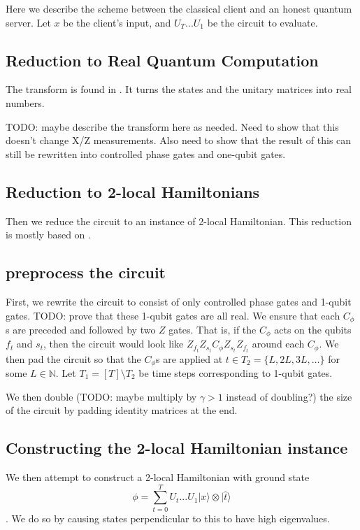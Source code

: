 \documentclass{article}
\theoremstyle{definition}
\begin{document}
Here we describe the scheme between the classical client and an honest quantum server.
Let $x$ be the client's input, and $U_T...U_1$ be the circuit to evaluate.

\subsection{Reduction to Real Quantum Computation}

The transform is found in \cite{1109.0795}. It turns the states and the unitary matrices into real numbers.

TODO: maybe describe the transform here as needed. Need to show that this doesn't change X/Z measurements. Also need to show that the result of this can still be rewritten into controlled phase gates and one-qubit gates.

\subsection{Reduction to 2-local Hamiltonians}

Then we reduce the circuit to an instance of 2-local Hamiltonian. This reduction is mostly based on \cite{quant-ph/0406180}.

\subsection{preprocess the circuit}

First, we rewrite the circuit to consist of only controlled phase gates and 1-qubit gates. TODO: prove that these 1-qubit gates are all real. We ensure that each $C_\phi$s are preceded and followed by two $Z$ gates. That is, if the $C_\phi$ acts on the qubits $f_t$ and $s_t$, then the circuit would look like $Z_{f_t}Z_{s_t}C_\phi Z_{s_t}Z_{f_t}$ around each $C_\phi$. We then pad the circuit so that the $C_\phi$s are applied at $t\in T_2=\{L, 2L, 3L, \ldots\}$ for some $L\in\mathbb{N}$. Let $T_1=[T]\setminus T_2$ be time steps corresponding to 1-qubit gates.

We then double (TODO: maybe multiply by $\gamma>1$ instead of doubling?) the size of the circuit by padding identity matrices at the end.

\subsection{Constructing the 2-local Hamiltonian instance}

We then attempt to construct a 2-local Hamiltonian with ground state $$\phi=\sum_{t=0}^TU_t...U_1|x\rangle\otimes|\hat{t}\rangle$$. We do so by causing states perpendicular to this to have high eigenvalues.
\end{document}
